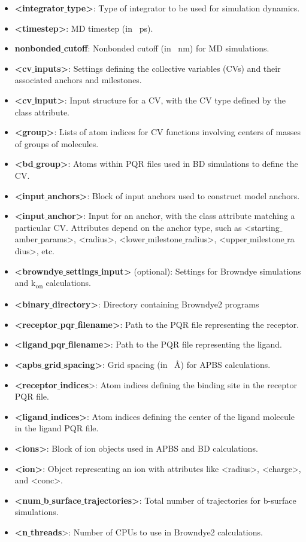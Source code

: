 \documentclass[9pt,training,pubversion]{livecoms}
\begin{document}
\begin{mdframed}[backgroundcolor=black!8!white, linewidth=0.5pt, leftmargin=0pt, rightmargin=10pt, innertopmargin=2pt, innerbottommargin=2pt]
\begin{itemize}[nosep]
\item \textbf{<integrator$\_$type>}: Type of integrator to be used for simulation dynamics.
\item \textbf{<timestep>}: MD timestep (in \SI{}{\pico\second}).
\item \textbf{nonbonded$\_$cutoff}: Nonbonded cutoff (in \SI{}{\nano\meter}) for MD simulations.
\item \textbf{<cv$\_$inputs>}: Settings defining the collective variables (CVs) and their associated anchors and milestones.
\item \textbf{<cv$\_$input>}: Input structure for a CV, with the CV type defined by the class attribute.
\item\textbf{ <group>}: Lists of atom indices for CV functions involving centers of masses of groups of molecules.
\item\textbf{ <bd$\_$group>}: Atoms within PQR files used in BD simulations to define the CV.
\item \textbf{<input$\_$anchors>}: Block of input anchors used to construct model anchors.
\item \textbf{<input$\_$anchor>}: Input for an anchor, with the class attribute matching a particular CV. Attributes depend on the anchor type, such as <starting$\_$amber$\_$params>, <radius>, <lower$\_$milestone$\_$radius>, <upper$\_$milestone$\_$ra \linebreak dius>, etc.
\item \textbf{<browndye$\_$settings$\_$input>} (optional): Settings for Browndye simulations and k\textsubscript{on} calculations.
\item \textbf{<binary$\_$directory>}: Directory containing Browndye2 programs
\item \textbf{<receptor$\_$pqr$\_$filename>}: Path to the PQR file representing the receptor.
\item \textbf{<ligand$\_$pqr$\_$filename>}: Path to the PQR file representing the ligand.
\item \textbf{<apbs$\_$grid$\_$spacing>}: Grid spacing (in \SI{}{\angstrom}) for APBS calculations.
\item\textbf{ <receptor$\_$indices}>: Atom indices defining the binding site in the receptor PQR file.
\item \textbf{<ligand$\_$indices>}: Atom indices defining the center of the ligand molecule in the ligand PQR file.
\item \textbf{<ions>}: Block of ion objects used in APBS and BD calculations.
\item \textbf{<ion>}: Object representing an ion with attributes like <radius>, <charge>, and <conc>.
\item \textbf{<num$\_$b$\_$surface$\_$trajectories>}: Total number of trajectories for b-surface simulations.
\item \textbf{<n$\_$threads}>: Number of CPUs to use in Browndye2 calculations.
\end{itemize}
\end{mdframed}
\end{document}
